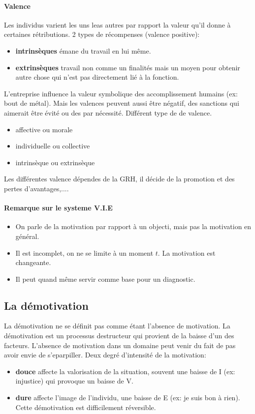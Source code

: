\documentclass[11pt]{article} %
\begin{document}
		 \paragraph{Valence} Les individus varient les uns leas autres par rapport  la valeur qu'il donne à 
		 certaines rétributions. 2 types de récompenses (valence positive):
		 \begin{itemize}
		 	\item \textbf{intrinsèques} émane du travail en lui même.
		 	\item \textbf{extrinsèques} travail non comme un finalités mais un moyen pour obtenir autre 
		 	chose qui n'est pas directement lié à la fonction.
		 \end{itemize}
		 L'entreprise influence la valeur symbolique des accomplissement humains (ex: bout de métal). Mais les
		 valences peuvent aussi être négatif, des sanctions qui aimerait être évité ou des par nécessité. 
		 Différent type de de valence.
		 \begin{multicols}{2}
		 	\begin{itemize}
		 		\item affective ou morale
		 		\item individuelle ou collective
		 		\item intrinsèque ou extrinsèque
		 	\end{itemize}
		 \end{multicols}
		 Les différentes valence dépendes de la GRH, il décide de la promotion et des pertes d'avantages,....
		 \paragraph{Remarque sur le systeme V.I.E}
		 \begin{itemize}
		 	\item On parle de la motivation par rapport à un objecti, mais pas la motivation en général.
		 	\item Il est incomplet, on ne se limite à un moment $t$. La motivation est changeante.
		 	\item Il peut quand même servir comme base pour un diagnostic.
		 \end{itemize}
	\subsection{La démotivation}
		La démotivation ne se définit pas comme étant l'absence de motivation. La démotivation est un
		processus destructeur qui provient de la baisse d'un des facteurs. L'absence de motivation dans un 
		domaine peut venir du fait de pas avoir envie de s'eparpiller. Deux degré d'intensité de la motivation:
		\begin{itemize}
			\item \textbf{douce} affecte la valorisation de la situation, souvent une baisse de I (ex: injustice) 
			qui 	provoque un baisse de V.
			\item \textbf{dure} affecte l'image de l'individu, une baisse de E (ex: je suis bon à rien). Cette 
			démotivation est difficilement réversible.
		\end{itemize}
\end{document}
